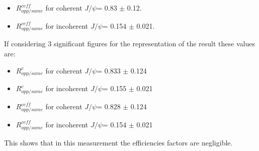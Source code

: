     \begin{itemize}
      \item $ R_{opp/same}^{ceff}$ for coherent $J/\psi$= 0.83 $\pm$ 0.12.
      \item $ R_{opp/same}^{ceff} $ for incoherent $J/\psi$= 0.154 $\pm$ 0.021.
    \end{itemize}
    
    If considering 3 significant figures for the representation of the result these
      values are: 
    \begin{itemize}
      \item $ R_{opp/same}^{c}$ for coherent $J/\psi$= 0.833 $\pm$ 0.124
      \item $ R_{opp/same}^{c}$ for incoherent $J/\psi$= 0.155 $\pm$ 0.021
      \item $ R_{opp/same}^{ceff}$ for coherent $J/\psi$= 0.828 $\pm$ 0.124
      \item $ R_{opp/same}^{ceff} $ for incoherent $J/\psi$= 0.154 $\pm$ 0.021
    \end{itemize}
    
    This shows that in this measurement the efficiencies factors are negligible. 
